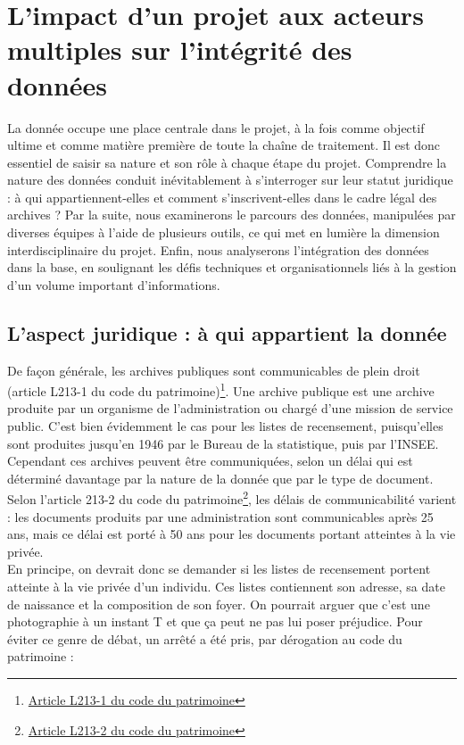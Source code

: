 \chapter{L’impact d’un projet aux acteurs multiples sur l’intégrité des données}

La donnée occupe une place centrale dans le projet, à la fois comme objectif ultime et comme matière première de toute la chaîne de traitement. Il est donc essentiel de saisir sa nature et son rôle à chaque étape du projet. Comprendre la nature des données conduit inévitablement à s'interroger sur leur statut juridique : à qui appartiennent-elles et comment s’inscrivent-elles dans le cadre légal des archives ? Par la suite, nous examinerons le parcours des données, manipulées par diverses équipes à l’aide de plusieurs outils, ce qui met en lumière la dimension interdisciplinaire du projet. Enfin, nous analyserons l'intégration des données dans la base, en soulignant les défis techniques et organisationnels liés à la gestion d’un volume important d’informations.   

    \section{L'aspect juridique : à qui appartient la donnée}

De façon générale, les archives publiques sont communicables de plein droit (article L213-1 du code du patrimoine)\footnote{\href{https://www.legifrance.gouv.fr/codes/article_lc/LEGIARTI000031971829}{Article L213-1 du code du patrimoine}}. Une archive publique est une archive produite par un organisme de l’administration ou chargé d’une mission de service public. C’est bien évidemment le cas pour les listes de recensement, puisqu’elles sont produites jusqu’en 1946 par le Bureau de la statistique, puis par l’INSEE. Cependant ces archives peuvent être communiquées, selon un délai qui est déterminé davantage par la nature de la donnée que par le type de document. Selon l’article 213-2 du code du patrimoine\footnote{\href{https://www.legifrance.gouv.fr/codes/article_lc/LEGIARTI000043887707}{Article L213-2 du code du patrimoine}}, les délais de communicabilité varient : les documents produits par une administration sont communicables après 25 ans, mais ce délai est porté à 50 ans pour les documents portant atteintes à la vie privée.\\
En principe, on devrait donc se demander si les listes de recensement portent atteinte à la vie privée d’un individu. Ces listes contiennent son adresse, sa date de naissance et la composition de son foyer. On pourrait arguer que c’est une photographie à un instant T et que ça peut ne pas lui poser préjudice. Pour éviter ce genre de débat, un arrêté a été pris, par dérogation au code du patrimoine :

